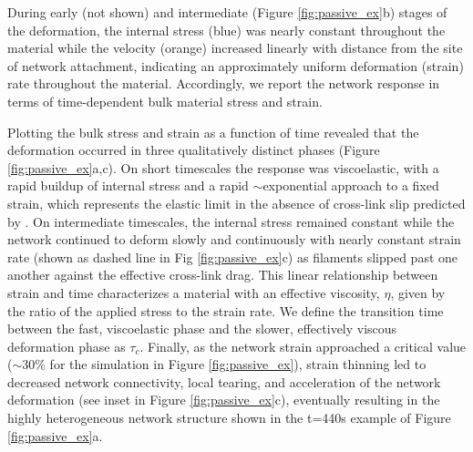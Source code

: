 \documentclass[10pt,letterpaper]{article}
\begin{document}
During early (not shown) and intermediate (Figure \ref{fig:passive_ex}b) stages of the deformation, the internal stress (blue) was nearly constant throughout the material while the velocity (orange) increased linearly with distance from the site of network attachment, indicating an approximately uniform deformation (strain) rate throughout the material. Accordingly, we report the network response in terms of time-dependent bulk material stress and strain.

Plotting the bulk stress and strain as a function of time revealed that the deformation occurred in three qualitatively distinct phases (Figure \ref{fig:passive_ex}a,c). On short timescales the response was viscoelastic, with a rapid buildup of internal stress and a rapid $\sim$exponential approach to a fixed strain, which represents the elastic limit in the absence of cross-link slip predicted by \cite{theo_hlm}. On intermediate timescales, the internal stress remained constant while the network continued to deform slowly and continuously with nearly constant strain rate (shown as dashed line in Fig \ref{fig:passive_ex}c) as filaments slipped past one another against the effective cross-link drag. This linear relationship between strain and time characterizes a material with an effective viscosity, $\eta$, given by the ratio of the applied stress to the strain rate. We define the transition time between the fast, viscoelastic phase and the slower, effectively viscous deformation phase as $\tau_c$. Finally, as the network strain approached a critical value ($\sim 30\%$ for the simulation in Figure \ref{fig:passive_ex}), strain thinning led to decreased network connectivity, local tearing, and acceleration of the network deformation (see inset in Figure \ref{fig:passive_ex}c), eventually resulting in the highly heterogeneous network structure shown in the t=440s example of Figure \ref{fig:passive_ex}a. 
\end{document}
